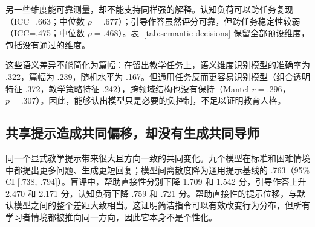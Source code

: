 \documentclass[11pt,a4paper,UTF8]{ctexart}
\begin{document}
另一些维度能可靠测量，却不能支持同样强的解释。认知负荷可以跨任务复现（ICC=.663；中位数 $\rho=.677$）；引导作答虽然评分可靠，但跨任务稳定性较弱（ICC=.475；中位数 $\rho=.468$）。表~\ref{tab:semantic-decisions} 保留全部预设维度，包括没有通过的维度。

\begin{table}[t]
  \centering
  \small
  \caption{全部预先指定的语义维度都保留并展示。可靠测量、跨任务重复与外部行为验证是不同层次的证据。}
  \label{tab:semantic-decisions}
\end{table}

这些语义差异不能简化为篇幅：在留出教学任务上，语义维度识别模型的准确率为 .322，篇幅为 .239，随机水平为 .167。但通用任务反而更容易识别模型（组合透明特征 .372，教学策略特征 .242），跨领域结构也没有保持（Mantel $r=.296$，$p=.307$）。因此，能够认出模型只是必要的负控制，不足以证明教育人格。

\subsection{共享提示造成共同偏移，却没有生成共同导师}

同一个显式教学提示带来很大且方向一致的共同变化。九个模型在标准和困难情境中都提出更多问题、生成更短回复；模型间离散度降为通用提示基线的 .763（95\% CI [.738, .794]）。盲评中，帮助直接性分别下降 1.709 和 1.542 分，引导作答上升 2.470 和 2.171 分，认知负荷下降 .759 和 .721 分。帮助直接性的提示位移，与默认模型之间的整个差距大致相当。这证明简洁指令可以有效改变行为分布，但所有学习者情境都被推向同一方向，因此它本身不是个性化。
\end{document}
